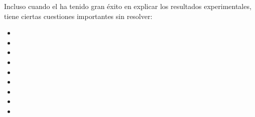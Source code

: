 Incluso cuando el \ME ha tenido gran éxito en explicar los resultados experimentales, tiene ciertas cuestiones importantes sin resolver:

\begin{itemize}
\item[-] 

\item[-] 

\item[-] 

\item[-] 

\item[-] 

\item[-] 

\item[-] 

\item[-] 

\item[-] 
\end{itemize}




